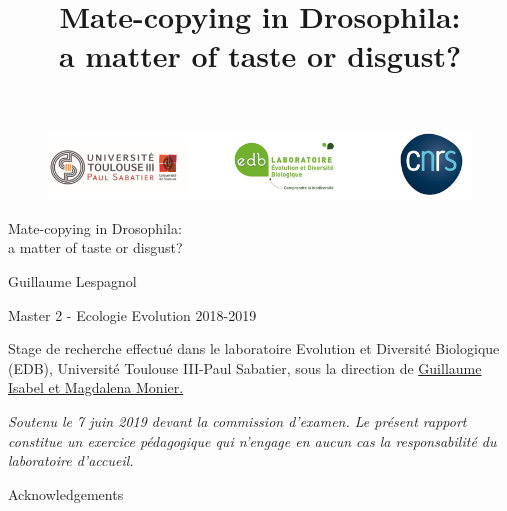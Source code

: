 \documentclass[a4paper, 12pt]{article}
\begin{document}
	
	
\title{Mate-copying in Drosophila:\\ a matter of taste or disgust?}		
\begin{figure}
	\vspace{-1cm}
	\hspace{-2cm}
	\includegraphics[width=20cm]{images/triche}
	
\end{figure}

\vspace*{3cm}


\begin{center}\huge Mate-copying in Drosophila:\\a matter of taste or disgust?\end{center}


\vspace*{1cm}

\begin{center}Guillaume Lespagnol\end{center}


\begin{center}Master 2 - Ecologie Evolution 2018-2019\end{center}

\vspace*{2cm}

Stage de recherche effectué dans le laboratoire Evolution et Diversité Biologique (EDB), Université Toulouse III-Paul Sabatier, sous la direction de \underline{Guillaume Isabel et Magdalena Monier.}
\vspace*{2cm}

\textit{Soutenu le 7 juin 2019 devant la
commission d'examen. Le présent rapport constitue un exercice 
pédagogique qui n'engage en aucun cas la responsabilité du laboratoire 
d'accueil.}





   
     \setcounter{page}{1} %
	
	
	\clearpage

	
 \begin{LARGE}
 	Acknowledgements
 \end{LARGE}
 
\end{document}
